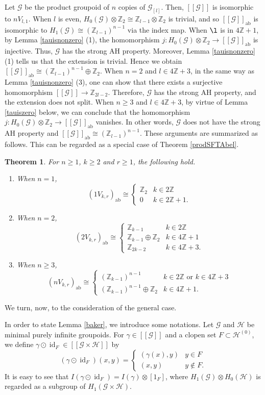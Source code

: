 \documentclass[11pt]{article}
\newtheorem{theorem}{Theorem}[section]
\theoremstyle{definition}
\numberwithin{equation}{section}
\newcommand{\id}{\operatorname{id}}
\newcommand{\ab}{\mathrm{ab}}
\newcommand{\G}{\mathcal{G}}
\renewcommand{\H}{\mathcal{H}}
\newcommand{\Z}{\mathbb{Z}}
\begin{document}
Let $\G$ be the product groupoid of $n$ copies of $\G_{[l]}$. 
Then, $[[\G]]$ is isomorphic to $nV_{l,1}$. 
When $l$ is even, $H_0(\G)\otimes\Z_2\cong\Z_{l-1}\otimes\Z_2$ is trivial, 
and so $[[\G]]_\ab$ is isomorphic to $H_1(\G)\cong(\Z_{l-1})^{n-1}$ 
via the index map. 
When $\l$ is in $4\Z+1$, by Lemma \ref{tauisnonzero} (1), 
the homomorphism $j:H_0(\G)\otimes\Z_2\to[[\G]]_\ab$ is injective. 
Thus, $\G$ has the strong AH property. 
Moreover, Lemma \ref{tauisnonzero} (1) tells us that the extension is trivial. 
Hence we obtain $[[\G]]_\ab\cong(\Z_{l-1})^{n-1}\oplus\Z_2$. 
When $n=2$ and $l\in4\Z+3$, in the same way as Lemma \ref{tauisnonzero} (3), 
one can show that there exists a surjective homomorphism $[[\G]]\to\Z_{2l-2}$. 
Therefore, $\G$ has the strong AH property, 
and the extension does not split. 
When $n\geq3$ and $l\in4\Z+3$, by virtue of Lemma \ref{tauiszero} below, 
we can conclude that 
the homomorphism $j:H_0(\G)\otimes\Z_2\to[[\G]]_\ab$ vanishes. 
In other words, $\G$ does not have the strong AH property and 
$[[\G]]_\ab\cong(\Z_{l-1})^{n-1}$. 
These arguments are summarized as follows. 
This can be regarded as a special case of Theorem \ref{prodSFTAbel}. 

\begin{theorem}\label{highdimThompAbel}
For $n\geq1$, $k\geq2$ and $r\geq1$, the following hold. 
\begin{enumerate}
\item When $n=1$, 
\[
(1V_{k,r})_\ab\cong\begin{cases}\Z_2&k\in2\Z\\0&k\in2\Z+1. \end{cases}
\]
\item When $n=2$, 
\[
(2V_{k,r})_\ab\cong\begin{cases}\Z_{k-1}&k\in2\Z\\
\Z_{k-1}\oplus\Z_2&k\in4\Z+1\\
\Z_{2k-2}&k\in4\Z+3. \end{cases}
\]
\item When $n\geq3$, 
\[
(nV_{k,r})_\ab\cong\begin{cases}(\Z_{k-1})^{n-1}&k\in2\Z\text{ or }k\in4\Z+3\\
(\Z_{k-1})^{n-1}\oplus\Z_2&k\in4\Z+1. \end{cases}
\]
\end{enumerate}
\end{theorem}

We turn, now, to the consideration of the general case. 

In order to state Lemma \ref{baker}, we introduce some notations. 
Let $\G$ and $\H$ be minimal purely infinite groupoids. 
For $\gamma\in[[\G]]$ and a clopen set $F\subset\H^{(0)}$, 
we define $\gamma\odot\id_F\in[[\G\times\H]]$ by 
\[
(\gamma\odot\id_F)(x,y)=\begin{cases}(\gamma(x),y)&y\in F\\
(x,y)&y\notin F. \end{cases}
\]
It is easy to see that $I(\gamma\odot\id_F)=I(\gamma)\otimes[1_F]$, 
where $H_1(\G)\otimes H_0(\H)$ is regarded 
as a subgroup of $H_1(\G\times\H)$. 
\end{document}
